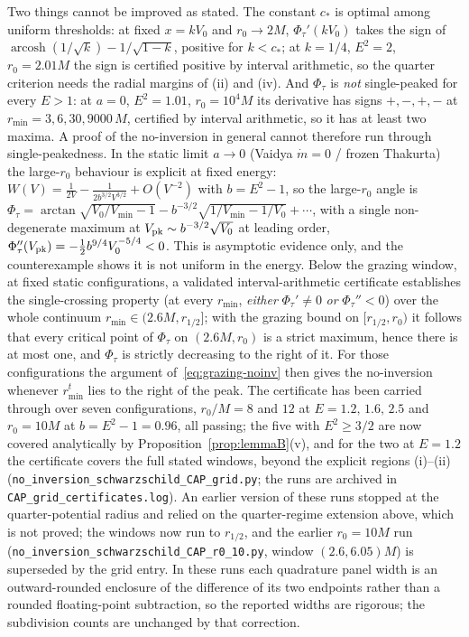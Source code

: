 \documentclass[12pt]{iopart}
\theoremstyle{plain}
\theoremstyle{definition}
\theoremstyle{remark}
\begin{document}
Two things cannot be improved as stated. The constant $c_\ast$ is optimal among uniform
thresholds: at fixed $x=kV_0$ and $r_0\to2M$, $\Phi_\tau'(kV_0)$ takes the sign of
$\operatorname{arcosh}(1/\sqrt k)-1/\sqrt{1-k}$, positive for $k<c_\ast$; at $k=1/4$,
$E^2=2$, $r_0=2.01M$ the sign is certified positive by interval arithmetic, so the quarter
criterion needs the radial margins of (ii) and (iv). And $\Phi_\tau$ is \emph{not}
single-peaked for every $E>1$: at $a=0$, $E^2=1.01$, $r_0=10^4M$ its derivative has signs
$+,-,+,-$ at $r_{\min}=3,6,30,9000\,M$, certified by interval arithmetic, so it has at
least two maxima. A proof of the no-inversion in general cannot therefore run through
single-peakedness. In the static limit $a\to0$ (Vaidya $\dot m=0$ / frozen Thakurta) the
large-$r_0$ behaviour is explicit at fixed energy:
$W(V)=\tfrac1{2V}-\tfrac1{2b^{3/2}V^{3/2}}+O(V^{-2})$ with $b=E^2-1$, so the
large-$r_0$ angle is
$\Phi_\tau=\arctan\!\sqrt{V_0/V_{\min}-1}-b^{-3/2}\sqrt{1/V_{\min}-1/V_0}+\cdots$,
with a single non-degenerate maximum at $V_{\rm pk}\sim b^{-3/2}\sqrt{V_0}$ at leading
order, $\Phi_\tau''(V_{\rm pk})=-\tfrac12 b^{9/4}V_0^{-5/4}<0$. This is asymptotic evidence
only, and the counterexample shows it is not uniform in the energy.
Below the grazing window, at fixed static configurations, a validated
interval-arithmetic certificate establishes the single-crossing property (at every
$r_{\min}$, \emph{either} $\Phi_\tau'\neq0$ \emph{or} $\Phi_\tau''<0$) over the whole
continuum $r_{\min}\in(2.6M,r_{1/2}]$; with the grazing bound on $[r_{1/2},r_0)$ it
follows that every critical point of $\Phi_\tau$ on $(2.6M,r_0)$ is a strict maximum,
hence there is at most one, and $\Phi_\tau$ is strictly decreasing to the right of it.
For those configurations the argument of~\eqref{eq:grazing-noinv} then gives the
no-inversion whenever $r_{\min}^t$ lies to the right of the peak. The certificate has been
carried through over seven configurations, $r_0/M=8$ and $12$ at $E=1.2,\,1.6,\,2.5$ and
$r_0=10M$ at $b=E^2-1=0.96$, all passing; the five with $E^2\ge3/2$ are now covered
analytically by Proposition~\ref{prop:lemmaB}(v), and for the two at $E=1.2$ the
certificate covers the full stated windows, beyond the explicit regions (i)--(ii)
(\texttt{no\_inversion\_schwarzschild\_CAP\_grid.py}; the runs are archived in
\texttt{CAP\_grid\_certificates.log}). An earlier version of these runs stopped at the
quarter-potential radius and relied on the quarter-regime extension above, which is not
proved; the windows now run to $r_{1/2}$, and the earlier $r_0=10M$ run
(\texttt{no\_inversion\_schwarzschild\_CAP\_r0\_10.py}, window $(2.6,6.05)M$) is
superseded by the grid entry. In these runs each quadrature panel width
is an outward-rounded enclosure of the difference of its two endpoints rather
than a rounded floating-point subtraction, so the reported widths are rigorous;
the subdivision counts are unchanged by that correction.
\end{document}
